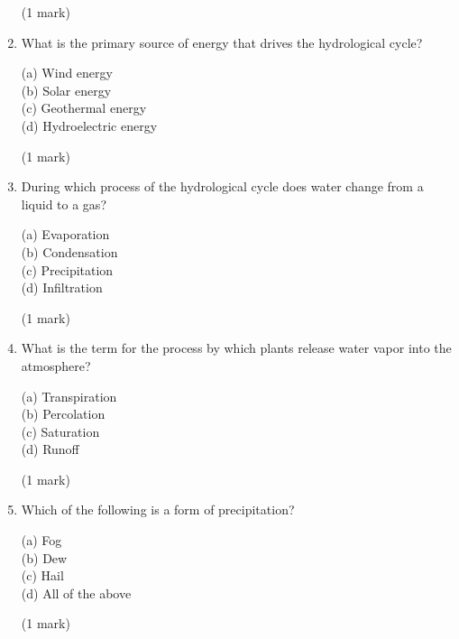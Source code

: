 \documentclass{article}
\begin{document}
\begin{enumerate}
\hfill\raggedright (1 mark) 
\vspace{5pt}
\hline
\vspace{7pt}

    \item What is the primary source of energy that drives the hydrological cycle?
    
    (a) Wind energy \\
    (b) Solar energy \\
    (c) Geothermal energy \\
    (d) Hydroelectric energy 

\hfill\raggedright (1 mark) 
\vspace{5pt}
\hline
\vspace{7pt}

    \item During which process of the hydrological cycle does water change from a liquid to a gas?
    
    (a) Evaporation \\
    (b) Condensation \\
    (c) Precipitation \\
    (d) Infiltration 

\hfill\raggedright (1 mark) 
\vspace{5pt}
\hline
\vspace{7pt}

\newpage

    \item What is the term for the process by which plants release water vapor into the atmosphere?
    
    (a) Transpiration \\
    (b) Percolation \\
    (c) Saturation \\
    (d) Runoff 

\hfill\raggedright (1 mark) 
\vspace{5pt}
\hline
\vspace{7pt}

    \item Which of the following is a form of precipitation?
    
    (a) Fog \\
    (b) Dew \\
    (c) Hail \\
    (d) All of the above 

\hfill\raggedright (1 mark) 
\vspace{5pt}
\hline
\vspace{7pt}


\end{enumerate}
\end{document}
